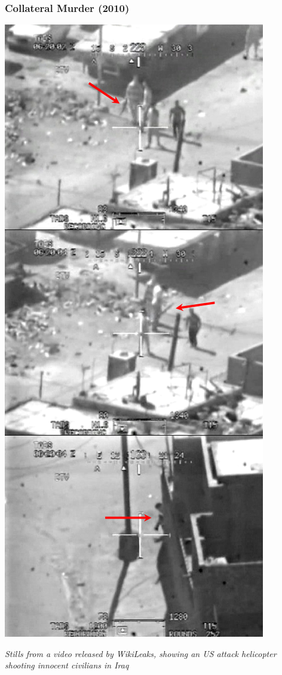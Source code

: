 \documentclass[aspectratio=169,usenames,dvipsnames]{beamer}
\begin{document}
\begin{frame}[c]
  \frametitle{Collateral Murder (2010)}

  \centering

  \includegraphics[width=\textwidth,height=0.7\textheight,keepaspectratio]{img/collateral_murder.png}

  \footnotesize
  \emph{Stills from a video released by WikiLeaks, showing an US attack
  helicopter shooting innocent civilians in Iraq}
\end{frame}
\end{document}
